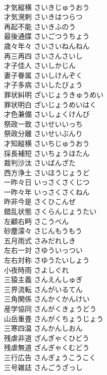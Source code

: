 \documentclass[8pt]{extreport}
\begin{document}
\begin{CJK}{UTF8}{min}
\\	才気縦横	さいきじゅうおう	
\\	才気溌剌	さいきはつらつ	
\\	再起不能	さいきふのう	
\\	最後通牒	さいごつうちょう	
\\	歳々年々	さいさいねんねん	
\\	再三再四	さいさんさいし	
\\	才子佳人	さいしかじん	
\\	妻子眷属	さいしけんぞく	
\\	才子多病	さいしたびょう	
\\	罪状糾明	ざいじょうきゅうめい	
\\	罪状明白	ざいじょうめいはく	
\\	才色兼備	さいしょくけんび	
\\	祭政一致	さいせいいっち	
\\	祭政分離	さいせいぶんり	
\\	才知縦横	さいちじゅうおう	
\\	採長補短	さいちょうほたん	
\\	裁判沙汰	さいばんざた	
\\	西方浄土	さいほうじょうど	
\\	一昨々日	いっさくさくじつ	
\\	一昨々年	いっさくさくねん	
\\	昨非今是	さくひこんぜ	
\\	錯乱状態	さくらんじょうたい	
\\	左顧右眄	さこうべん	
\\	砂塵濛々	さじんもうもう	
\\	五月雨式	さみだれしき	
\\	左右一対	さゆういっつい	
\\	左右対称	さゆうたいしょう	
\\	小夜時雨	さよしぐれ	
\\	三猿主義	さんえんしゅぎ	
\\	三界流転	さんがいるてん	
\\	三角関係	さんかくかんけい	
\\	産学協同	さんがくきょうどう	
\\	山岳重畳	さんがくちょうじょう	
\\	三寒四温	さんかんしおん	
\\	残虐非道	ざんぎゃくひどう	
\\	残虐無道	ざんぎゃくむどう	
\\	三行広告	さんぎょうこうこく	
\\	三号雑誌	さんごうざっし	

\end{CJK}
\end{document}
